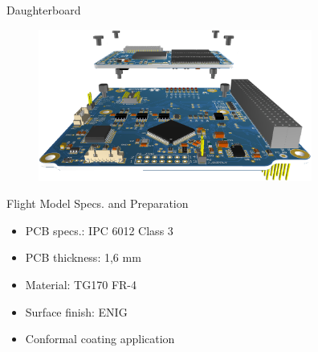 \begin{frame}{Daughterboard}

    \begin{figure}[!ht]
        \begin{center}
            \includegraphics[width=9cm]{figures/daughterboard-integration.png}
        \end{center}
    \end{figure}

\end{frame}

\begin{frame}{Flight Model Specs. and Preparation}

    \begin{itemize}
        \item PCB specs.: IPC 6012 Class 3
        \vspace{0.3cm}
        \item PCB thickness: 1,6 mm
        \vspace{0.3cm}
        \item Material: TG170 FR-4
        \vspace{0.3cm}
        \item Surface finish: ENIG
        \vspace{0.3cm}
        \item Conformal coating application
    \end{itemize}

\end{frame}